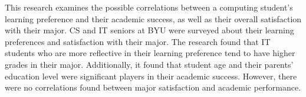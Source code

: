 \afterpage{\cleardoublepage}
This research examines the possible correlations between a computing student's learning preference and their academic success, as well as their overall satisfaction with their major. CS and IT seniors at BYU were surveyed about their learning preferences and satisfaction with their major. The research found that IT students who are more reflective in their learning preference tend to have higher grades in their major. Additionally, it found that student age and their parents' education level were significant players in their academic success. However, there were no correlations found between major satisfaction and academic performance.
